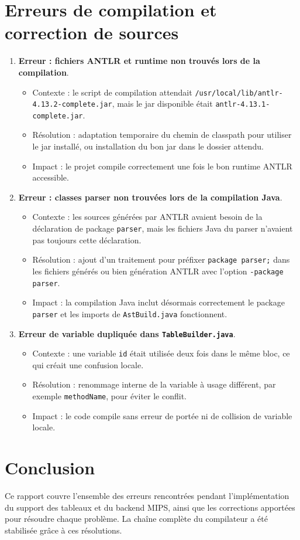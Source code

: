 \documentclass[a4paper,11pt]{article}
\begin{document}
\section{Erreurs de compilation et correction de sources}
\begin{enumerate}[label=\arabic*)]
  \item \textbf{Erreur  : fichiers ANTLR et runtime non trouvés lors de la compilation}.
  \begin{itemize}
    \item Contexte : le script de compilation attendait \texttt{/usr/local/lib/antlr-4.13.2-complete.jar}, mais le jar disponible était \texttt{antlr-4.13.1-complete.jar}.
    \item Résolution : adaptation temporaire du chemin de classpath pour utiliser le jar installé, ou installation du bon jar dans le dossier attendu.
    \item Impact : le projet compile correctement une fois le bon runtime ANTLR accessible.
  \end{itemize}

  \item \textbf{Erreur : classes parser non trouvées lors de la compilation Java}.
  \begin{itemize}
    \item Contexte : les sources générées par ANTLR avaient besoin de la déclaration de package \texttt{parser}, mais les fichiers Java du parser n'avaient pas toujours cette déclaration.
    \item Résolution : ajout d'un traitement pour préfixer \texttt{package parser;} dans les fichiers générés ou bien génération ANTLR avec l'option \texttt{-package parser}.
    \item Impact : la compilation Java inclut désormais correctement le package \texttt{parser} et les imports de \texttt{AstBuild.java} fonctionnent.
  \end{itemize}

  \item \textbf{Erreur de variable dupliquée dans \texttt{TableBuilder.java}}.
  \begin{itemize}
    \item Contexte : une variable \texttt{id} était utilisée deux fois dans le même bloc, ce qui créait une confusion locale.
    \item Résolution : renommage interne de la variable à usage différent, par exemple \texttt{methodName}, pour éviter le conflit.
    \item Impact : le code compile sans erreur de portée ni de collision de variable locale.
  \end{itemize}
\end{enumerate}

\section*{Conclusion}
Ce rapport couvre l'ensemble des erreurs rencontrées pendant l'implémentation du support des tableaux et du backend MIPS, ainsi que les corrections apportées pour résoudre chaque problème. La chaîne complète du compilateur a été stabilisée grâce à ces résolutions.
\end{document}

